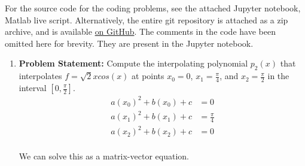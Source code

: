 \documentclass[12pt,twoside]{amsart}
\begin{document}
\thispagestyle{fancy}
\pagestyle{fancy}
\fancyhf{}

For the source code for the coding problems, see the attached Jupyter notebook, Matlab live script. Alternatively, the entire git repository  is attached as a zip archive, and is available \href{https://github.com/blackHat-Magic/math-131-HW3}{on GitHub}. The comments in the code have been omitted here for brevity. They are present in the Jupyter notebook.

\begin{enumerate}
    \item \textbf{Problem Statement:} Compute the interpolating polynomial $p_2(x)$ that interpolates $f = \sqrt{2}xcos(x)$ at points $x_0 = 0$, $x_1 = \frac{\pi}{4}$, and $x_2 = \frac{\pi}{2}$ in the interval $[0, \frac{\pi}{2}]$.
    \begin{align*}
    a(x_0)^2 + b(x_0) + c & = 0 \\
    a(x_1)^2 + b(x_1) + c & = \frac{\pi}{4} \\
    a(x_2)^2 + b(x_2) + c & = 0 \\
    \end{align*}

    We can solve this as a matrix-vector equation.


\end{enumerate}
\end{document}
